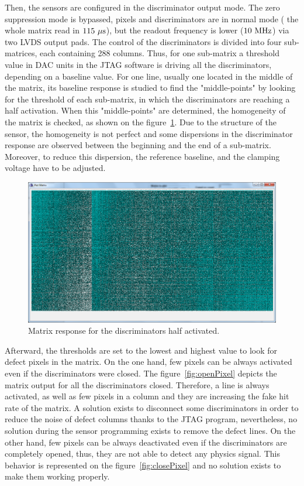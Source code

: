   Then, the sensors are configured in the discriminator output mode.
  The zero suppression mode is bypassed, pixels and discriminators are in normal mode ( the whole matrix read in $115~\mu\rm{s}$), but the readout frequency is lower ($10~\rm{MHz}$) via two LVDS output pads.
  The control of the discriminators is divided into four sub-matrices, each containing 288 columns.
  Thus, for one sub-matrix a threshold value in DAC units in the \gls{JTAG} software is driving all the discriminators, depending on a baseline value.
  For one line, usually one located in the middle of the matrix, its baseline response is studied to find the "middle-points" by looking for the threshold of each sub-matrix, in which the discriminators are reaching a half activation.
  When this "middle-points" are determined, the homogeneity of the matrix is checked, as shown on the figure~\ref{fig:homogeneityMi26}.
  Due to the structure of the sensor, the homogeneity is not perfect and some dispersions in the discriminator response are observed between the beginning and the end of a sub-matrix.
  Moreover, to reduce this dispersion, the reference baseline, and the clamping voltage have to be adjusted.
  
  \begin{figure}[!h]
    \centering
    \includegraphics[width = \textwidth]{Pictures/labTests/discri_middle.png}
    \caption{Matrix response for the discriminators half activated.}
    \label{fig:homogeneityMi26}
  \end{figure}
  
  Afterward, the thresholds are set to the lowest and highest value to look for defect pixels in the matrix.
  On the one hand, few pixels can be always activated even if the discriminators were closed.
  The figure~\ref{fig:openPixel} depicts the matrix output for all the discriminators closed.
  Therefore, a line is always activated, as well as few pixels in a column and they are increasing the fake hit rate of the matrix.
  A solution exists to disconnect some discriminators in order to reduce the noise of defect columns thanks to the \gls{JTAG} program, nevertheless, no solution during the sensor programming exists to remove the defect lines.
  On the other hand, few pixels can be always deactivated even if the discriminators are completely opened, thus, they are not able to detect any physics signal.
  This behavior is represented on the figure~\ref{fig:closePixel} and no solution exists to make them working properly.
   

